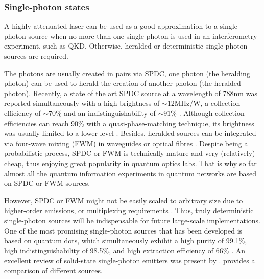 \documentclass[aps, rmp, twocolumn, amsmath, amssymb, nofootinbib, superscriptaddress, longbibliography, floatfix, table-of-contents, eqsecnum]{revtex4-1}
\newcommand{\comment}[1]{{\color{blue}{\textbf{#1}}}}
\begin{document}
%
%

\subsubsection{Single-photon states} 

\comment{Section complete. But add table.}

A highly attenuated laser can be used as a good approximation to a single-photon source when no more than one single-photon is used in an interferometry experiment, such as QKD. Otherwise, heralded or deterministic single-photon sources are required.

The photons are usually created in pairs via SPDC, one photon (the heralding photon) can be used to herald the creation of another photon (the heralded photon). Recently, a state of the art SPDC source at a wavelength of 788nm was reported simultaneously with a high brightness of $\sim$12MHz/W, a collection efficiency of $\sim 70\%$ and an indistinguishability of $\sim 91\%$ \cite{bib:tenPhotEnt}. Although collection efficiencies can reach 90\% with a quasi-phase-matching technique, its brightness was usually limited to a lower level \cite{giustina2013, christensen2013}. Besides, heralded sources can be integrated via four-wave mixing (FWM) in waveguides  \cite{silverstone2014, spring2016} or optical fibres  \cite{goldschmidt2008, smith2009}. Despite being a probabilistic process, SPDC or FWM is technically mature and very (relatively) cheap, thus enjoying great popularity in quantum optics labs. That is why so far almost all the quantum information experiments in quantum networks are based on SPDC or FWM sources.

However, SPDC or FWM might not be easily scaled to arbitrary size due to higher-order emissions, or multiplexing requirements \cite{bib:RohdeLoopMulti15}. Thus, truly deterministic single-photon sources will be indispensable for future large-scale implementations. One of the most promising single-photon sources that has been developed is based on quantum dots, which simultaneously exhibit a high purity of 99.1\%, high indistinguishability of 98.5\%, and high extraction efficiency of 66\% \cite{he2013on, wei2014de, ding2016on, somaschi2016, wang2016near, loredo2016}. An excellent review of solid-state single-photon emitters was present by \cite{aharonovich2016solid}. \cite{eisaman2011} provides a comparison of different sources.

%
%
\end{document}

